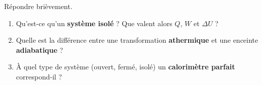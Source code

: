 \documentclass[11pt,a4paper]{article}
\newcommand{\dU}{\Delta U}
\begin{document}
\begin{exercice}
Répondre brièvement.
\begin{enumerate}[label=\alph*),leftmargin=2em,topsep=2pt,itemsep=2pt]
  \item Qu'est-ce qu'un \textbf{système isolé} ? Que valent alors $Q$, $W$ et $\dU$ ?
  \item Quelle est la différence entre une transformation \textbf{athermique} et une enceinte \textbf{adiabatique} ?
  \item À quel type de système (ouvert, fermé, isolé) un \textbf{calorimètre parfait} correspond-il ?
\end{enumerate}
\end{exercice}
\end{document}
